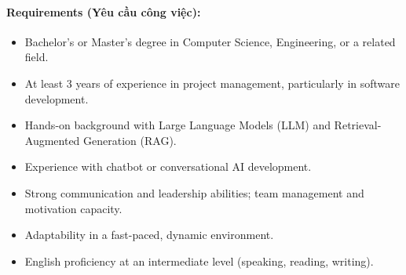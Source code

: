 \paragraph{Requirements (Yêu cầu công việc):}
\begin{itemize}
    \item Bachelor's or Master's degree in Computer Science, Engineering, or a related field.
    \item At least 3 years of experience in project management, particularly in software development.
    \item Hands-on background with Large Language Models (LLM) and Retrieval-Augmented Generation (RAG).
    \item Experience with chatbot or conversational AI development.
    \item Strong communication and leadership abilities; team management and motivation capacity.
    \item Adaptability in a fast-paced, dynamic environment.
    \item English proficiency at an intermediate level (speaking, reading, writing).
\end{itemize}
